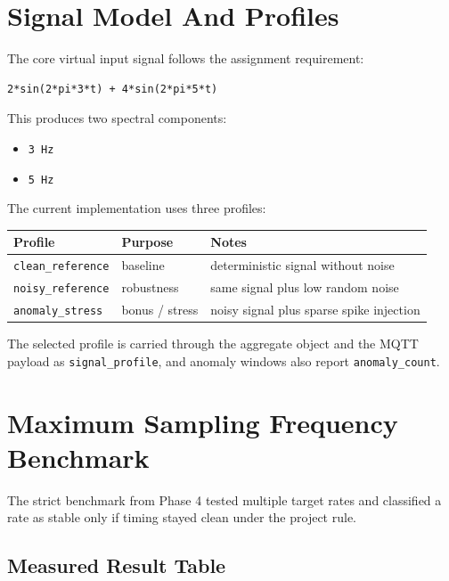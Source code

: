\documentclass[12pt,a4paper]{article}
\begin{document}
\section{Signal Model And Profiles}

The core virtual input signal follows the assignment requirement:

\begin{lstlisting}
2*sin(2*pi*3*t) + 4*sin(2*pi*5*t)
\end{lstlisting}

This produces two spectral components:

\begin{itemize}
    \item \texttt{3 Hz}
    \item \texttt{5 Hz}
\end{itemize}

The current implementation uses three profiles:

\begin{center}
\begin{tabularx}{\textwidth}{|>{\raggedright\arraybackslash}p{}|>{\raggedright\arraybackslash}p{}|X|}
\hline
\textbf{Profile} & \textbf{Purpose} & \textbf{Notes} \\
\hline
\texttt{clean\_reference} & baseline & deterministic signal without noise \\
\hline
\texttt{noisy\_reference} & robustness & same signal plus low random noise \\
\hline
\texttt{anomaly\_stress} & bonus / stress & noisy signal plus sparse spike injection \\
\hline
\end{tabularx}
\end{center}

The selected profile is carried through the aggregate object and the MQTT
payload as \texttt{signal\_profile}, and anomaly windows also report
\texttt{anomaly\_count}.

\section{Maximum Sampling Frequency Benchmark}

The strict benchmark from Phase 4 tested multiple target rates and classified a
rate as stable only if timing stayed clean under the project rule.

\subsection{Measured Result Table}
\end{document}
